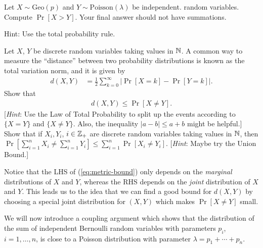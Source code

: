 \documentclass[11pt]{article}
\begin{document}

Let $X\sim \text{Geo}(p)$ and $Y\sim \text{Poisson}(\lambda)$ be independent. random variables. Compute $\Pr[X>Y]$. Your final answer should not have summations.

Hint: Use the total probability rule.


\begin{Parts}
    \Part Let $X$, $Y$ be discrete random variables taking values in $\mathbb{N}$.
    A common way to measure the ``distance'' between two probability distributions is known as the total variation norm, and it is given by
    \begin{align*}
        d(X, Y) &= \frac{1}{2} \sum_{k=0}^\infty |\Pr[X = k] - \Pr[Y = k]|.
    \end{align*}
    Show that
    \begin{align} \label{eq:metric-bound}
        d(X, Y) \leq \Pr[X \neq Y].
    \end{align}
    [\textit{Hint}: Use the Law of Total Probability to split up the events according to $\{X = Y\}$ and $\{X \neq Y\}$. Also, the inequality $|a - b| \leq a + b$ might be helpful.]
    \Part Show that if $X_i, Y_i$, $i \in \mathbb{Z}_+$ are discrete random variables taking values in $\mathbb{N}$, then $\Pr[\sum_{i=1}^n X_i \neq \sum_{i=1}^n Y_i] \leq \sum_{i=1}^n \Pr[X_i \neq Y_i]$.
    [\textit{Hint}: Maybe try the Union Bound.]
\end{Parts}

Notice that the LHS of (\ref{eq:metric-bound}) only depends on the \textit{marginal} distributions of $X$ and $Y$, whereas the RHS depends on the \textit{joint} distribution of $X$ and $Y$.
This leads us to the idea that we can find a good bound for $d(X, Y)$ by choosing a special joint distribution for $(X, Y)$ which makes $\Pr[X \ne Y]$ small.

We will now introduce a coupling argument which shows that the distribution of the sum of independent Bernoulli random variables with parameters $p_i$, $i = 1, \dotsc, n$, is close to a Poisson distribution with parameter $\lambda = p_1 + \cdots + p_n$.
\end{document}
